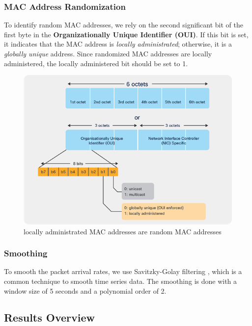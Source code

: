 \documentclass[sigconf,nonacm]{acmart}
\begin{document}
\subsubsection{MAC Address Randomization}
\label{sec:part-1/ana/mac-randomization}

To identify random MAC addresses, we rely on the second significant bit of the first byte in the \textbf{Organizationally Unique Identifier (OUI)}. If this bit is set, it indicates that the MAC address is \textit{locally administrated}; otherwise, it is a \textit{globally unique} address. Since randomized MAC addresses are locally administered, the locally administered bit should be set to 1. \cite{cisco2022rcm}

\begin{figure}[h]
    \centering
    \includegraphics[width=\columnwidth]{images/randomized-changing-mac-dg_2.png}
    \caption{locally administrated MAC addresses are random MAC addresses \cite{cisco2022rcm}}
    \label{fig:random-mac-address}
\end{figure}

\subsubsection{Smoothing}
To smooth the packet arrival rates, we use Savitzky-Golay filtering \cite{savitzky1964smoothing}, which is a common technique to smooth time series data. The smoothing is done with a window size of 5 seconds and a polynomial order of 2.

\subsection{Results Overview}
\label{sec:part-1/res}
\end{document}
